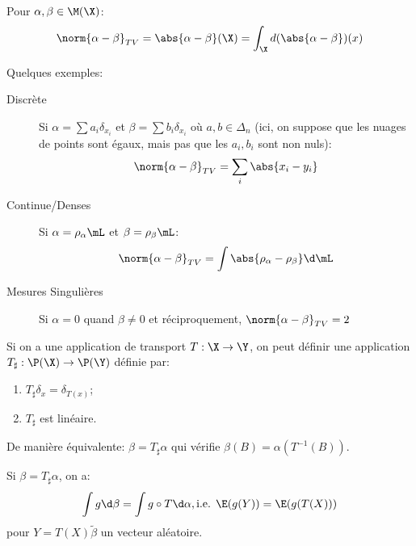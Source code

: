 \documentclass[info, math, french]{mpb-cours}
\begin{document}
\begin{proposition}
	Pour $\alpha, \beta \in \M(\X)$:
	\begin{equation*}
		\norm{\alpha - \beta}_{TV} = \abs{\alpha - \beta}(\X) = \int_{\X} d(\abs{\alpha -\beta})(x)
	\end{equation*}
\end{proposition}
Quelques exemples:
\begin{description}
	\item[Discrète] Si $\alpha = \sum a_{i}\delta_{x_{i}}$ et $\beta = \sum b_{i}\delta_{x_{i}}$ où $a, b \in \Delta_{n}$ (ici, on suppose que les nuages de points sont égaux, mais pas que les $a_{i}, b_{i}$ sont non nuls):
	      \begin{equation*}
		      \norm{\alpha - \beta}_{TV} = \sum_{i} \abs{x_{i} - y_{i}}
	      \end{equation*}
	\item[Continue/Denses] Si $\alpha = \rho_{\alpha}\mL$ et $\beta = \rho_{\beta}\mL$:
	      \begin{equation*}
		      \norm{\alpha - \beta}_{TV} = \int \abs{\rho_{\alpha} - \rho_{\beta}}\d\mL
	      \end{equation*}
	\item[Mesures Singulières] Si $\alpha = 0$ quand $\beta \neq 0$ et réciproquement, $\norm{\alpha - \beta}_{TV} = 2$
\end{description}

\begin{definition}
	Si on a une application de transport $T: \X \to \Y$, on peut définir une application $T_{\sharp}: \P(\X) \to \P(\Y)$ définie par:
	\begin{enumerate}
		\item $T_{\sharp}\delta_{x} = \delta_{T(x)}$;
		\item $T_{\sharp}$ est linéaire.
	\end{enumerate}
	De manière équivalente: $\beta = T_{\sharp}\alpha$ qui vérifie $\beta(B) = \alpha(T^{-1}(B))$.
\end{definition}

\begin{proposition}
	Si $\beta = T_{\sharp}\alpha$, on a:
	\begin{equation*}
		\int g\d\beta = \int g \circ T \d\alpha, \text{i.e. } \E(g(Y)) = \E(g(T(X)))
	\end{equation*}
	pour $Y = T(X)\tilde \beta$ un vecteur aléatoire.
\end{proposition}
\end{document}

